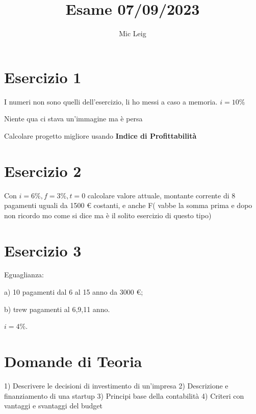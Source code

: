 \documentclass{article}
\title{Esame 07/09/2023}
\author{Mic Leig}
\begin{document}
\maketitle



\section{Esercizio {1}}
I numeri non sono quelli dell'esercizio, li ho messi a caso a memoria.
$i = 10\%$

Niente qua ci stava un'immagine ma è persa

Calcolare progetto migliore usando \textbf{Indice di Profittabilità}


\section{Esercizio 2}
Con $i = 6\%, f = 3\%, t=0$ calcolare valore attuale, montante corrente di 8 pagamenti uguali da 1500 \euro
costanti, e anche F( vabbe la somma prima e dopo non ricordo mo come si dice ma è il solito esercizio di questo tipo)

\section{Esercizio 3}
Eguaglianza:

a) 10 pagamenti dal 6 al 15 anno da 3000 \euro;

b) trew pagamenti al 6,9,11 anno.

$i = 4\%$.

\section{Domande di Teoria}
1) Descrivere le decisioni di investimento di un'impresa
2) Descrizione e finanziamento di una startup
3) Principi base della contabilità
4) Criteri con vantaggi e svantaggi del budget
\end{document}
